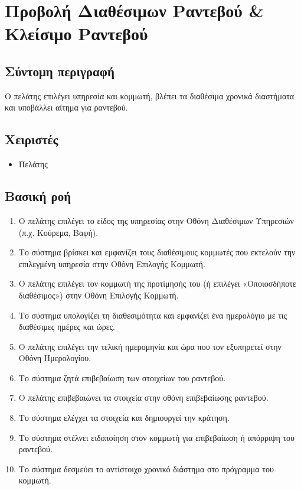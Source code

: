 \documentclass[12pt,a4paper,twoside]{book}
\begin{document}
\section{Προβολή Διαθέσιμων Ραντεβού \& Κλείσιμο Ραντεβού}

\subsection{Σύντομη περιγραφή}
Ο πελάτης επιλέγει υπηρεσία και κομμωτή, βλέπει τα διαθέσιμα χρονικά διαστήματα και υποβάλλει αίτημα για ραντεβού.

\subsection{Χειριστές}
\begin{itemize}
    \item Πελάτης
\end{itemize}

\subsection{Βασική ροή}
\begin{enumerate}
    \item Ο πελάτης επιλέγει το είδος της υπηρεσίας στην Οθόνη Διαθέσιμων Υπηρεσιών (π.χ. Κούρεμα, Βαφή).
    \item Το σύστημα βρίσκει και εμφανίζει τους διαθέσιμους κομμωτές που εκτελούν την επιλεγμένη υπηρεσία στην Οθόνη Επιλογής Κομμωτή.
    \item Ο πελάτης επιλέγει τον κομμωτή της προτίμησής του (ή επιλέγει «Οποιοσδήποτε διαθέσιμος») στην Οθόνη Επιλογής Κομμωτή.
    \item Το σύστημα υπολογίζει τη διαθεσιμότητα και εμφανίζει ένα ημερολόγιο με τις διαθέσιμες ημέρες και ώρες.
    \item Ο πελάτης επιλέγει την τελική ημερομηνία και ώρα που τον εξυπηρετεί στην Οθόνη Ημερολογίου.
    \item Το σύστημα ζητά επιβεβαίωση των στοιχείων του ραντεβού.
    \item Ο πελάτης επιβεβαιώνει τα στοιχεία στην οθόνη επιβεβαίωσης ραντεβού.
    \item Το σύστημα ελέγχει τα στοιχεία και δημιουργεί την κράτηση.
    \item Το σύστημα στέλνει ειδοποίηση στον κομμωτή για επιβεβαίωση ή απόρριψη του ραντεβού.
    \item Το σύστημα δεσμεύει το αντίστοιχο χρονικό διάστημα στο πρόγραμμα του κομμωτή.
\end{enumerate}
\end{document}
